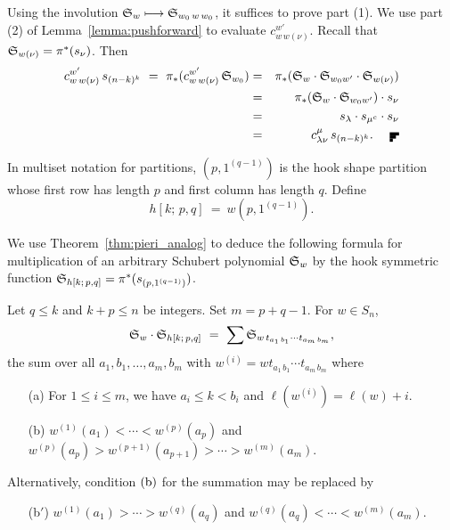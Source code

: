  Using the involution
${\frak S}_{w} \longmapsto {\frak S}_{w_0\,w\,w_0}$, it suffices to 
prove part (1).
We use  part (2) of Lemma~\ref{lemma:pushforward} to 
evaluate $c^{w'}_{w\,w(\nu)}$. 
Recall that ${\frak S}_{w(\nu)} = \pi^*(s_\nu)$.  Then 
\begin{eqnarray*}
c^{w'}_{w\,w(\nu)}\, s_{(n-k)^k}\   =\  
\pi_*(c^{w'}_{w\,w(\nu)}\,  {\frak S}_{w_0}) &=&
\pi_*({\frak S}_w\cdot{\frak S}_{w_0w'}\cdot {\frak S}_{w(\nu)})\\
&=& \pi_*({\frak S}_w\cdot{\frak S}_{w_0w'}) \cdot s_\nu\\
&=& s_\lambda \cdot s_{\mu^c}\cdot s_\nu\\
&=& c^{\mu}_{\lambda\nu}\,  s_{(n-k)^k}. \ \ \ \  \QED
\end{eqnarray*}

In multiset notation for partitions,  $(p,1^{(q-1)})$ 
is the hook shape partition whose first row has length $p$ and 
first column has length $q$.
Define
$$
h[k;\,p,q] \   =\   w(p,1^{(q-1)}).
$$

We use Theorem~\ref{thm:pieri_analog} to deduce the following
formula for multiplication of an arbitrary Schubert polynomial
${\frak S}_w$ by the hook symmetric function 
${\frak S}_{h[k;\,p,q]} =  \pi^*(s_{(p,1^{(q-1)})})$.

\begin{thm}
Let $q\leq k$ and $k{+}p \leq n$ be integers.
Set $m = p{+}q{-}1$.
For $w\in S_n$,
$$
{\frak S}_w \cdot {\frak S}_{h[k;\,p,q]} \   =\  
\sum {\frak S}_{w\, t_{a_1\,b_1}\cdots t_{a_m\,b_m}},
$$
the sum over all $a_1,b_1,\ldots,a_m,b_m$ with 
$w^{(i)} = w t_{a_1\,b_1}\cdots t_{a_m\,b_m}$ where
\begin{enumerate}
\item[(a)] For $1\leq i\leq m$, we have $a_i \leq k < b_i$
and $\ell(w^{(i)}) = \ell(w) +i$.
\smallskip
\item[(b)] $w^{(1)}(a_1) < \cdots < w^{(p)}(a_p)$ and
$w^{(p)}(a_p) > w^{(p{+}1)}(a_{p{+}1})>\cdots > w^{(m)}(a_m)$.
\end{enumerate}
Alternatively, condition $(\mbox{\rm b})$ for the summation may be replaced by
\begin{enumerate}
\item[(b$'$)] 
$w^{(1)}(a_1) > \cdots > w^{(q)}(a_q)$ and
$w^{(q)}(a_q) <\cdots < w^{(m)}(a_m)$.
\end{enumerate}
\end{thm}

